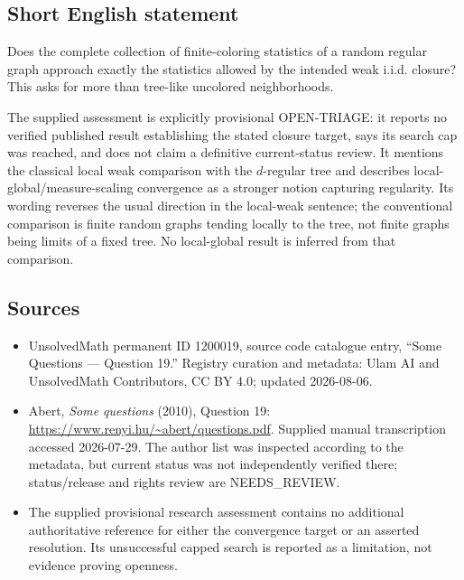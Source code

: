 \documentclass[11pt]{article}
\begin{document}
\subsection{Short English statement}
Does the complete collection of finite-coloring statistics of a random regular graph approach exactly the statistics allowed by the intended weak i.i.d. closure? This asks for more than tree-like uncolored neighborhoods.

The supplied assessment is explicitly provisional OPEN-TRIAGE: it reports no verified published result establishing the stated closure target, says its search cap was reached, and does not claim a definitive current-status review. It mentions the classical local weak comparison with the $d$-regular tree and describes local-global/measure-scaling convergence as a stronger notion capturing regularity. Its wording reverses the usual direction in the local-weak sentence; the conventional comparison is finite random graphs tending locally to the tree, not finite graphs being limits of a fixed tree. No local-global result is inferred from that comparison.
\subsection{Sources}
\begin{itemize}
\item UnsolvedMath permanent ID 1200019, source code catalogue entry, ``Some Questions --- Question 19.'' Registry curation and metadata: Ulam AI and UnsolvedMath Contributors, CC BY 4.0; updated 2026-08-06.
\item Abert, \emph{Some questions} (2010), Question 19: \url{https://www.renyi.hu/~abert/questions.pdf}. Supplied manual transcription accessed 2026-07-29. The author list was inspected according to the metadata, but current status was not independently verified there; status/release and rights review are NEEDS\_REVIEW.
\item The supplied provisional research assessment contains no additional authoritative reference for either the convergence target or an asserted resolution. Its unsuccessful capped search is reported as a limitation, not evidence proving openness.
\end{itemize}
\end{document}
